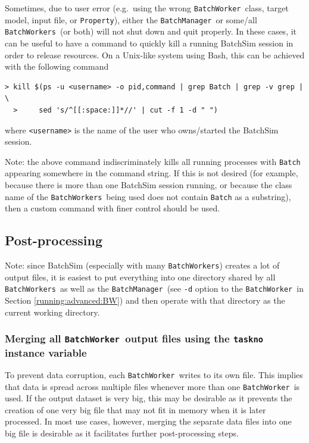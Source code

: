 \documentclass{article}
\newcommand{\BM}{{\tt BatchManager}}
\newcommand{\BW}{{\tt BatchWorker}}
\newcommand{\BWs}{{\tt BatchWorkers}}
\begin{document}
Sometimes, due to user error (e.g.\ using the wrong \BW\ class, target model, input file, or {\tt Property}), either the \BM\ or some/all \BWs\ (or both) will not shut down and quit properly. In these cases, it can be useful to have a command to quickly kill a running BatchSim session in order to release resources. On a Unix-like system using Bash, this can be achieved with the following command

\begin{lstlisting}[]
  > kill $(ps -u <username> -o pid,command | grep Batch | grep -v grep | \
  >     sed 's/^[[:space:]]*//' | cut -f 1 -d " ")
\end{lstlisting}

where {\tt <username>} is the name of the user who owns/started the BatchSim session.

\begin{sideblock}
Note: the above command indiscriminately kills all running processes with {\tt Batch} appearing somewhere in the command string. If this is not desired (for example, because there is more than one BatchSim session running, or because the class name of the \BWs\ being used does not contain {\tt Batch} as a substring), then a custom command with finer control should be used.
\end{sideblock}

\subsection{Post-processing}
\label{misc:post}

\begin{sideblock}
Note: since BatchSim (especially with many \BWs) creates a lot of output files, it is easiest to put everything into one directory shared by all \BWs\ as well as the \BM\ (see {\tt -d} option to the \BW\ in Section \ref{running:advanced:BW}) and then operate with that directory as the current working directory.
\end{sideblock}

\subsubsection{Merging all \BW\ output files using the {\tt taskno} instance variable}
\label{misc:post:merging}

To prevent data corruption, each \BW\ writes to its own file. This implies that data is spread across multiple files whenever more than one \BW\ is used. If the output dataset is very big, this may be desirable as it prevents the creation of one very big file that may not fit in memory when it is later processed. In most use cases, however, merging the separate data files into one big file is desirable as it facilitates further post-processing steps.
\end{document}
